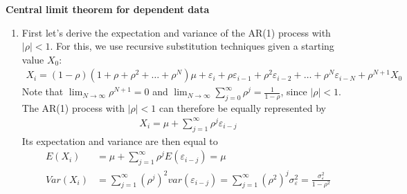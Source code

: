 \begin{Solution}{9.4}
\textbf{Central limit theorem for dependent data}

\begin{enumerate}
  \item First let's derive the expectation and variance of the AR(1) process with $|\rho|<1$. For this, we use recursive substitution techniques given a starting value $X_0$:
    \begin{align*}
      X_i = (1-\rho)(1+\rho+\rho^2+\dots+\rho^N)\mu + \varepsilon_i + \rho \varepsilon_{i-1} + \rho^2 \varepsilon_{i-2} + \dots + \rho^N \varepsilon_{i-N} + \rho^{N+1} X_0
    \end{align*}
    Note that $\lim_{N\rightarrow \infty} \rho^{N+1} = 0$ and $\lim_{N\rightarrow \infty} \sum_{j=0}^\infty \rho^j = \frac{1}{1-\rho}$, since $|\rho|<1$. The AR(1) process with $|\rho|<1$ can therefore be equally represented by
    \begin{align*}
    X_i = \mu + \sum_{j=1}^\infty \rho^j \varepsilon_{i-j}
    \end{align*}
    Its expectation and variance are then equal to
    \begin{align*}
    E(X_i) &= \mu + \sum_{j=1}^\infty \rho^j E(\varepsilon_{i-j}) = \mu\\
    Var(X_i) &= \sum_{j=1}^\infty (\rho^j)^2 var(\varepsilon_{i-j}) = \sum_{j=1}^\infty (\rho^2)^j \sigma_\varepsilon^2 = \frac{\sigma_\varepsilon^2}{1-\rho^2}
    \end{align*}


\end{enumerate}
\end{Solution}

